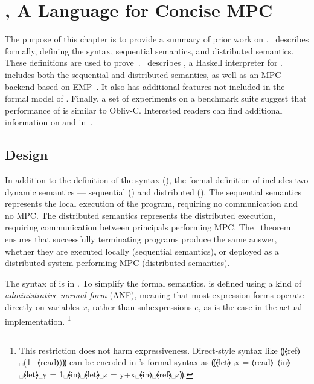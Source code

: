\chapter{\mpc, A Language for Concise MPC}
\label{ch:mpc}

The purpose of this chapter is to provide a summary of prior work on \mpc.~ describes \mpc
formally, defining the syntax, sequential semantics, and distributed semantics. These definitions are used to
prove~.~ describes \system, a Haskell interpreter for \mpc.
\system includes both the sequential and distributed semantics, as well as an MPC backend based on EMP~\cite{}.
It also has additional features not included in the formal model of \mpc. Finally, a set of experiments on a
benchmark suite suggest that performance of \system is similar to Obliv-C. Interested readers can find
additional information on \mpc and \system in~\citet{todo}.

\section{Design}
\label{sec:mpc-design}

In addition to the definition of the syntax (), the formal definition of \mpc
includes two dynamic semantics --- sequential () and distributed ().
The sequential semantics represents the local execution of the program, requiring no communication
and no MPC. The distributed semantics represents the distributed execution, requiring communication
between principals performing MPC. The~ theorem ensures that successfully
terminating programs produce the same answer, whether they are executed locally (sequential semantics),
or deployed as a distributed system performing MPC (distributed semantics).

The syntax of \mpc is in . To simplify the formal semantics,
\mpc is defined using a kind of \emph{administrative normal form} (ANF), meaning
that most expression forms operate directly on variables $x$, rather than subexpressions $e$,
as is the case in the actual implementation.
\footnote{ This restriction does not harm expressiveness. Direct-style syntax like ⸨⦑ref⦒␣(1+⦑read⦒)⸩
can be encoded in \mpc's formal syntax as ⸨⦑let⦒␣x = ⦑read⦒␣⦑in⦒␣⦑let⦒␣y = 1␣⦑in⦒␣⦑let⦒␣z = y+x␣⦑in⦒␣⦑ref⦒␣z⸩. }


